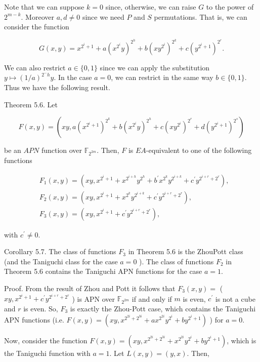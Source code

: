 \documentclass[10pt]{article}
\begin{document}
Note that we can suppose $k=0$ since, otherwise, we can raise $G$ to the power of $2^{m-k}$. Moreover $a, d \neq 0$ since we need $P$ and $S$ permutations. That is, we can consider the function

$$
G(x, y)=x^{2^{i}+1}+a\left(x^{2^{i}} y\right)^{2^{h}}+b\left(x y^{2^{i}}\right)^{2^{k}}+c\left(y^{2^{i}+1}\right)^{2^{r}} .
$$

We can also restrict $a \in\{0,1\}$ since we can apply the substitution $y \mapsto (1 / a)^{2^{-} h} y$. In the case $a=0$, we can restrict in the same way $b \in\{0,1\}$. Thus we have the following result.

Theorem 5.6. Let

$$
F(x, y)=\left(x y, a\left(x^{2^{i}+1}\right)^{2^{k}}+b\left(x^{2^{i}} y\right)^{2^{h}}+c\left(x y^{2^{i}}\right)^{2^{r}}+d\left(y^{2^{i}+1}\right)^{2^{s}}\right)
$$

be an $A P N$ function over $\mathbb{F}_{2^{2 m}}$. Then, $F$ is $E A$-equivalent to one of the following functions

$$
\begin{aligned}
& F_{1}(x, y)=\left(x y, x^{2^{i}+1}+x^{2^{i+h}} y^{2^{h}}+b^{\prime} x^{2^{k}} y^{2^{i+k}}+c^{\prime} y^{2^{i+r}+2^{r}}\right), \\
& F_{2}(x, y)=\left(x y, x^{2^{i}+1}+x^{2^{k}} y^{2^{i+k}}+c^{\prime} y^{2^{i+r}+2^{r}}\right), \\
& F_{3}(x, y)=\left(x y, x^{2^{i}+1}+c^{\prime} y^{2^{i+r}+2^{r}}\right),
\end{aligned}
$$

with $c^{\prime} \neq 0$.

Corollary 5.7. The class of functions $F_{3}$ in Theorem 5.6 is the ZhouPott class (and the Taniguchi class for the case $a=0$ ). The class of functions $F_{2}$ in Theorem 5.6 contains the Taniguchi APN functions for the case $a=1$.

Proof. From the result of Zhou and Pott it follows that $F_{3}(x, y)=$ ( $x y, x^{2^{i}+1}+c^{\prime} y^{2^{i+r}+2^{r}}$ ) is APN over $\mathbb{F}_{2^{2 m}}$ if and only if $m$ is even, $c^{\prime}$ is not a cube and $r$ is even. So, $F_{3}$ is exactly the Zhou-Pott case, which contains the Taniguchi APN functions (i.e. $F(x, y)=\left(x y, x^{2^{2 i}+2^{3 i}}+a x^{2^{2 i}} y^{2^{i}}+b y^{2^{i}+1}\right)$ ) for $a=0$.

Now, consider the function $F(x, y)=\left(x y, x^{2^{2 i}+2^{3 i}}+x^{2^{2 i}} y^{2^{i}}+b y^{2^{i}+1}\right)$, which is the Taniguchi function with $a=1$. Let $L(x, y)=(y, x)$. Then,
\end{document}
